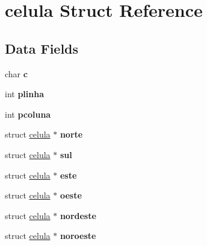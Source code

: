 \hypertarget{structcelula}{}\section{celula Struct Reference}
\label{structcelula}
\subsection*{Data Fields}
\begin{DoxyCompactItemize}
\item 
\mbox{\label{structcelula_adc08ed1554f35803d229aeaf11216b3f}} 
char {\bfseries c}
\item 
\mbox{\label{structcelula_ad087ee05bb7acc813fe618e1bce1e2a0}} 
int {\bfseries plinha}
\item 
\mbox{\label{structcelula_aec034fbbf4a74e9d88c5e90231015aef}} 
int {\bfseries pcoluna}
\item 
\mbox{\label{structcelula_a9fd26f085619bfe7ed15fb49f16c69cf}} 
struct \mbox{\hyperlink{structcelula}{celula}} $\ast$ {\bfseries norte}
\item 
\mbox{\label{structcelula_a46c557ea39bebedf242f130a310fdf89}} 
struct \mbox{\hyperlink{structcelula}{celula}} $\ast$ {\bfseries sul}
\item 
\mbox{\label{structcelula_a8e4bec791986b904658caf1fd27e7282}} 
struct \mbox{\hyperlink{structcelula}{celula}} $\ast$ {\bfseries este}
\item 
\mbox{\label{structcelula_adcc44608a7aac574069c229b90cc2208}} 
struct \mbox{\hyperlink{structcelula}{celula}} $\ast$ {\bfseries oeste}
\item 
\mbox{\label{structcelula_ae50d46616d23fbbcf9c801477932475f}} 
struct \mbox{\hyperlink{structcelula}{celula}} $\ast$ {\bfseries nordeste}
\item 
\mbox{\label{structcelula_aa82be877b08e62255fbe7f8266303365}} 
struct \mbox{\hyperlink{structcelula}{celula}} $\ast$ {\bfseries noroeste}
\item 
\mbox{\label{structcelula_acc4a3924ba464470317b98b49df837c6}} 

\end{DoxyCompactItemize}
